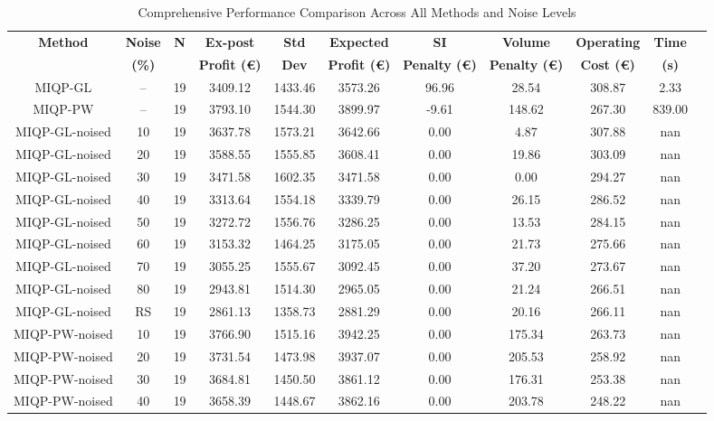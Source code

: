 \begin{table}[!t]
\centering
\caption{Comprehensive Performance Comparison Across All Methods and Noise Levels}
\label{tab:method_comparison_updated}
\setlength{\tabcolsep}{3.5pt}
\begin{tabular}{ccccccccccc}
\toprule
\textbf{Method} & \textbf{Noise} & \textbf{N} & \textbf{Ex-post} & \textbf{Std} & \textbf{Expected} & \textbf{SI} & \textbf{Volume} & \textbf{Operating} & \textbf{Time} \\
 & \textbf{(\%)} &  & \textbf{Profit (€)} & \textbf{Dev} & \textbf{Profit (€)} & \textbf{Penalty (€)} & \textbf{Penalty (€)} & \textbf{Cost (€)} & \textbf{(s)} \\
\midrule
MIQP-GL & -- & 19 & 3409.12 & 1433.46 & 3573.26 & 96.96 & 28.54 & 308.87 & 2.33 \\
MIQP-PW & -- & 19 & 3793.10 & 1544.30 & 3899.97 & -9.61 & 148.62 & 267.30 & 839.00 \\
MIQP-GL-noised & 10 & 19 & 3637.78 & 1573.21 & 3642.66 & 0.00 & 4.87 & 307.88 & nan \\
MIQP-GL-noised & 20 & 19 & 3588.55 & 1555.85 & 3608.41 & 0.00 & 19.86 & 303.09 & nan \\
MIQP-GL-noised & 30 & 19 & 3471.58 & 1602.35 & 3471.58 & 0.00 & 0.00 & 294.27 & nan \\
MIQP-GL-noised & 40 & 19 & 3313.64 & 1554.18 & 3339.79 & 0.00 & 26.15 & 286.52 & nan \\
MIQP-GL-noised & 50 & 19 & 3272.72 & 1556.76 & 3286.25 & 0.00 & 13.53 & 284.15 & nan \\
MIQP-GL-noised & 60 & 19 & 3153.32 & 1464.25 & 3175.05 & 0.00 & 21.73 & 275.66 & nan \\
MIQP-GL-noised & 70 & 19 & 3055.25 & 1555.67 & 3092.45 & 0.00 & 37.20 & 273.67 & nan \\
MIQP-GL-noised & 80 & 19 & 2943.81 & 1514.30 & 2965.05 & 0.00 & 21.24 & 266.51 & nan \\
MIQP-GL-noised & RS & 19 & 2861.13 & 1358.73 & 2881.29 & 0.00 & 20.16 & 266.11 & nan \\
MIQP-PW-noised & 10 & 19 & 3766.90 & 1515.16 & 3942.25 & 0.00 & 175.34 & 263.73 & nan \\
MIQP-PW-noised & 20 & 19 & 3731.54 & 1473.98 & 3937.07 & 0.00 & 205.53 & 258.92 & nan \\
MIQP-PW-noised & 30 & 19 & 3684.81 & 1450.50 & 3861.12 & 0.00 & 176.31 & 253.38 & nan \\
MIQP-PW-noised & 40 & 19 & 3658.39 & 1448.67 & 3862.16 & 0.00 & 203.78 & 248.22 & nan \\

\end{tabular}
\end{table}
